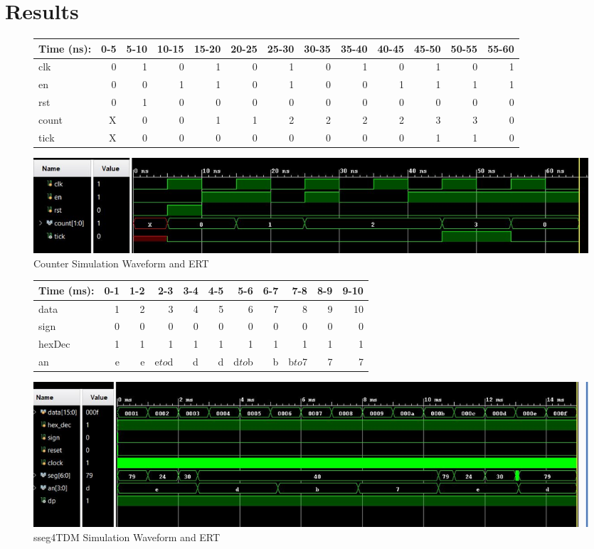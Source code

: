 \documentclass[11pt]{article}
\begin{document}
\section*{Results}

\begin{figure}[ht]\centering
	
	\begin{tabular}{l|rrrrrrrrrrrr}	
		Time (ns): & 0-5 & 5-10 & 10-15 & 15-20 & 20-25 & 25-30 & 30-35 & 35-40 & 40-45 & 45-50 & 50-55 & 55-60 \\
		\midrule
		clk     & 0 & 1 & 0 & 1 & 0 & 1 & 0 & 1 & 0 & 1 & 0 & 1\\
		en  	& 0 & 0 & 1 & 1 & 0 & 1 & 0 & 0 & 1 & 1 & 1 & 1\\
		rst 	& 0 & 1 & 0 & 0 & 0	& 0 & 0 & 0 & 0	& 0 & 0 & 0\\
		\midrule
		count 	& X & 0 & 0 & 1 & 1 & 2 & 2	& 2 & 2 & 3 & 3 & 0 \\
		tick	& X & 0 & 0 & 0 & 0 & 0 & 0	& 0 & 0 & 1 & 1 & 0 \\
		\bottomrule
	\end{tabular}
	\bigskip
	\includegraphics[width=1\textwidth,angle=0,origin=c]{counterWaveform}
	\caption{Counter Simulation Waveform and ERT}
	\label{fig:sim_with_table}
\end{figure}

\begin{figure}[ht]\centering
	
	\begin{tabular}{l|rrrrrrrrrr}
		Time (ms): & 0-1 & 1-2 & 2-3 & 3-4 & 4-5 & 5-6 & 6-7 & 7-8 & 8-9 & 9-10\\
		\midrule
		data  & 1 & 2 & 3      & 4 & 5 & 	  6 & 7 & 	   8 & 9 & 10 \\
		sign  & 0 & 0 & 0      & 0 & 0 &   	  0 & 0 & 	   0 & 0 & 0 \\
		hexDec & 1& 1 & 1      & 1 & 1 &      1 & 1 &      1 & 1 & 1 \\ 
		\midrule
		an    & e & e & e$to$d & d & d & d$to$b & b & b$to$7 & 7 & 7 \\
		\bottomrule
	\end{tabular}
	\bigskip
	\includegraphics[width=1\textwidth,angle=0,origin=c]{sseg4tdmWaveform}
	\caption{sseg4TDM Simulation Waveform and ERT}
	\label{fig:sim_with_table}
\end{figure}
\end{document}

